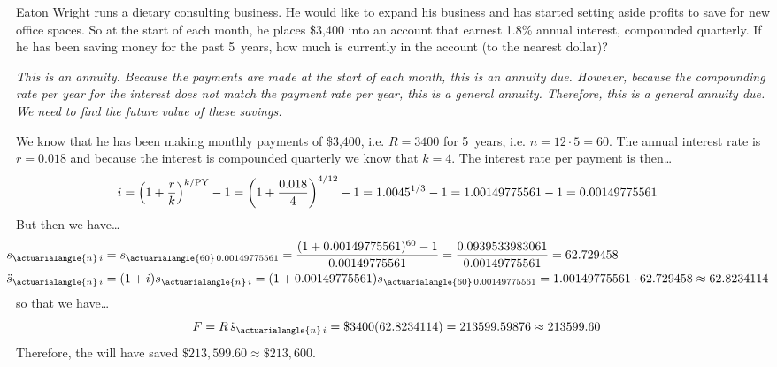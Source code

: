 \documentclass[12pt,letterpaper]{exam}
\begin{document}
\begin{questions}
\newpage
\question[10] Eaton Wright runs a dietary consulting business. He would like to expand his business and has started setting aside profits to save for new office spaces. So at the start of each month, he places \$3,400 into an account that earnest 1.8\% annual interest, compounded quarterly. If he has been saving money for the past 5~years, how much is currently in the account (to the nearest dollar)? \pspace

{\itshape 
\sol This is an annuity. Because the payments are made at the start of each month, this is an annuity due. However, because the compounding rate per year for the interest does not match the payment rate per year, this is a general annuity. Therefore, this is a general annuity due. We need to find the future value of these savings. \pspace

We know that he has been making monthly payments of \$3,400, i.e. $R= 3400$ for 5~years, i.e. $n= 12 \cdot 5= 60$. The annual interest rate is $r= 0.018$ and because the interest is compounded quarterly we know that $k= 4$. The interest rate per payment is then\dots
	\[
	\hspace{-0.5cm} i= \left(1 + \dfrac{r}{k} \right)^{k/\text{PY}} - 1= \left(1 + \dfrac{0.018}{4} \right)^{4/12} - 1= 1.0045^{1/3} - 1= 1.00149775561 - 1= 0.00149775561
	\]
But then we have\dots
	\[
	\begin{aligned}
	\hspace{-0.5cm} s_{\actuarialangle{n}\,i}&= s_{\actuarialangle{60}\,0.00149775561}= \dfrac{(1 + 0.00149775561)^{60} - 1}{0.00149775561}= \dfrac{0.0939533983061}{0.00149775561}= 62.729458 \\
	\hspace{-0.5cm} \ddot{s}_{\actuarialangle{n}\,i}&= (1 + i) s_{\actuarialangle{n}\,i}= (1 + 0.00149775561) s_{\actuarialangle{60}\,0.00149775561}= 1.00149775561 \cdot 62.729458 \approx 62.8234114
	\end{aligned}
	\]
so that we have\dots
	\[
	F= R\, \ddot{s}_{\actuarialangle{n}\,i}= \$3400 (62.8234114)= 213599.59876 \approx 213599.60
	\]
Therefore, the will have saved $\$213,599.60 \approx \$213,600$. 
}


\end{questions}
\end{document}
